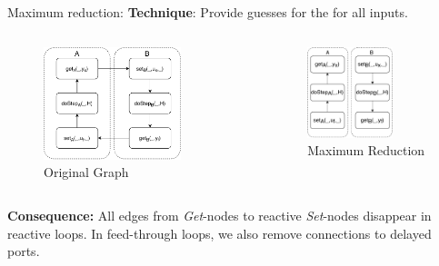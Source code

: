 \documentclass{beamer}
\begin{document}
\begin{frame}{Maximum reduction:}
    \textbf{Technique}: Provide guesses for the for all inputs.
    \begin{columns}[T] %
        \begin{column}{.48\textwidth}
            \begin{figure}    
                \includegraphics[width=0.8\textwidth]{images/reactive_step_graph.pdf}
                \caption{Original Graph}
            \end{figure}
    \end{column}%
    \hfill%
    \begin{column}{.48\textwidth}
        \begin{figure}    
            \includegraphics[width=0.7\textwidth]{images/jacobian_reduced_graph.pdf}
            \caption{Maximum Reduction}
        \end{figure}
    \end{column}%
    \end{columns}
    \textbf{Consequence:}
    All edges from \textit{Get}-nodes to reactive \textit{Set}-nodes disappear in reactive loops.
    In feed-through loops, we also remove connections to delayed ports.  
\end{frame}
\end{document}
